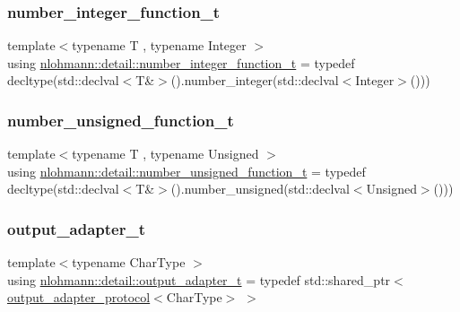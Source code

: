 \mbox{\label{namespacenlohmann_1_1detail_a4a3e14a011b9ea1ff849fc6d2411e6a0}} 
\subsubsection{\texorpdfstring{number\+\_\+integer\+\_\+function\+\_\+t}{number\_integer\_function\_t}}
{\footnotesize\ttfamily template$<$typename T , typename Integer $>$ \\
using \hyperlink{namespacenlohmann_1_1detail_a4a3e14a011b9ea1ff849fc6d2411e6a0}{nlohmann\+::detail\+::number\+\_\+integer\+\_\+function\+\_\+t} = typedef decltype(std\+::declval$<$T\&$>$().number\+\_\+integer(std\+::declval$<$Integer$>$()))}

\mbox{\label{namespacenlohmann_1_1detail_a74da7b17bda76f65d276feb18209c913}} 
\subsubsection{\texorpdfstring{number\+\_\+unsigned\+\_\+function\+\_\+t}{number\_unsigned\_function\_t}}
{\footnotesize\ttfamily template$<$typename T , typename Unsigned $>$ \\
using \hyperlink{namespacenlohmann_1_1detail_a74da7b17bda76f65d276feb18209c913}{nlohmann\+::detail\+::number\+\_\+unsigned\+\_\+function\+\_\+t} = typedef decltype(std\+::declval$<$T\&$>$().number\+\_\+unsigned(std\+::declval$<$Unsigned$>$()))}

\mbox{\label{namespacenlohmann_1_1detail_a9b680ddfb58f27eb53a67229447fc556}} 
\subsubsection{\texorpdfstring{output\+\_\+adapter\+\_\+t}{output\_adapter\_t}}
{\footnotesize\ttfamily template$<$typename Char\+Type $>$ \\
using \hyperlink{namespacenlohmann_1_1detail_a9b680ddfb58f27eb53a67229447fc556}{nlohmann\+::detail\+::output\+\_\+adapter\+\_\+t} = typedef std\+::shared\+\_\+ptr$<$\hyperlink{structnlohmann_1_1detail_1_1output__adapter__protocol}{output\+\_\+adapter\+\_\+protocol}$<$Char\+Type$>$ $>$}



